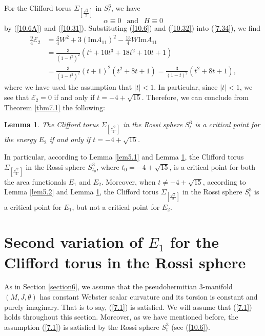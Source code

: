 \documentclass{amsart}
\newtheorem{lem}[theorem]{Lemma}
\theoremstyle{Corollary}
\numberwithin{equation}{section}
\begin{document}
For the Clifford torus $\Sigma_{[\frac{\sqrt{2}}{2}]}$
in $S^3_t$, we have 
\begin{equation}\label{10.32}
\alpha\equiv 0~~\mbox{ and }~~H\equiv 0
\end{equation}
by (\ref{10.6A}) and (\ref{10.31}).
Substituting (\ref{10.6}) and (\ref{10.32}) into 
(\ref{7.34}), we find
\begin{equation*}
\begin{split}
\frac{9}{4}\mathcal{E}_2&=\frac{3}{4}W^2
+3(\mbox{Im}A_{11})^2-\frac{15}{4}W\mbox{Im}A_{11}\\
&=\frac{3}{(1-t^2)^2}(t^4+10t^3+18t^2+10t+1)\\
&=\frac{3}{(1-t^2)^2}(t+1)^2(t^2+8t+1)
=\frac{3}{(1-t)^2}(t^2+8t+1),
\end{split}
\end{equation*}
where we have used the assumption that $|t|<1$. 
In particular, since $|t|<1$, 
we see that $\mathcal{E}_2=0$ 
if and only if $t=-4+\sqrt{15}$. 
Therefore,
we can conclude from Theorem \ref{thm7.1} 
the following: 

\begin{lem}\label{lem5.4}
The Clifford torus
 $\Sigma_{[\frac{\sqrt{2}}{2}]}$ 
in the Rossi sphere $S^3_{t}$
is a critical point for the energy $E_2$ 
if and only if $t=-4+\sqrt{15}$.
\end{lem}

In particular,  according to Lemma \ref{lem5.1} and Lemma \ref{lem5.4}, 
the Clifford torus
 $\Sigma_{[\frac{\sqrt{2}}{2}]}$ in the Rossi sphere 
 $S^3_{t_0}$, where $t_0=-4+\sqrt{15}$, 
 is a critical point for both the area functionals $E_1$ and $E_2$. 
Moreover, when $t\neq -4+\sqrt{15}$, 
according to Lemma \ref{lem5.2} and Lemma \ref{lem5.4}, 
the Clifford torus $\Sigma_{[\frac{\sqrt{2}}{2}]}$ in the Rossi sphere $S^3_t$ 
 is a critical point for $E_1$, but not a critical point for $E_2$. 
 
 
 
\section{Second variation of $E_1$ for the Clifford torus in the Rossi sphere}\label{section10}
 
 
 
As in Section \ref{section6}, we assume that the pseudohermitian $3$-manifold $(M,J,\theta)$
has constant Webster scalar curvature and 
its torsion is constant and purely imaginary. That is to say,
(\ref{7.1}) is satisfied. We will assume that (\ref{7.1}) holds throughout this section. 
Moreover, as we have mentioned before, the assumption (\ref{7.1}) is satisfied by the Rossi sphere
$S^3_t$ (see (\ref{10.6}). 
\end{document}
